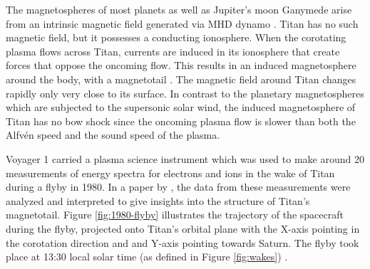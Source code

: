 \documentclass[12pt, parskip=full*, abstract]{scrartcl}
\begin{document}
The magnetospheres of most planets as well as Jupiter's moon Ganymede arise from an intrinsic magnetic field generated via MHD dynamo \parencite{encyclopedia-magnetospheres}. Titan has no such magnetic field, but it possesses a conducting ionosphere. When the corotating plasma flows across Titan, currents are induced in its ionosphere that create forces that oppose the oncoming flow. This results in an induced magnetosphere around the body, with a magnetotail . The magnetic field around Titan changes rapidly only very close to its surface. In contrast to the planetary magnetospheres which are subjected to the supersonic solar wind, the induced magnetosphere of Titan has no bow shock since the oncoming plasma flow is slower than both the Alfvén speed and the sound speed of the plasma. 





Voyager 1 carried a plasma science instrument which was used to make around 20 measurements of energy spectra for electrons and ions in the wake of Titan during a flyby in 1980. In a paper by \textcite{hartle-1982}, the data from these measurements were analyzed and interpreted to give insights into the structure of Titan's magnetotail. Figure \ref{fig:1980-flyby} illustrates the trajectory of the spacecraft during the flyby, projected onto Titan's orbital plane with the X-axis pointing in the corotation direction and and Y-axis pointing towards Saturn. The flyby took place at 13:30 local solar time (as defined in Figure \ref{fig:wakes}) \parencite{ness-1982}. 
\end{document}
